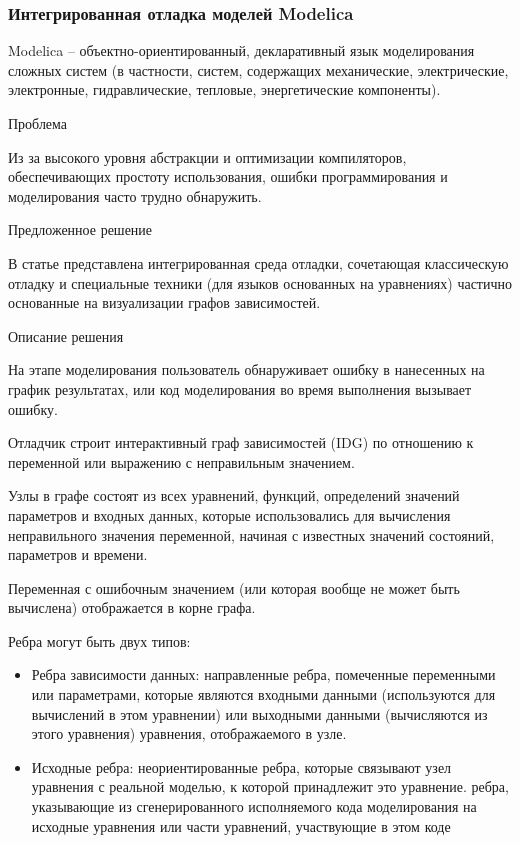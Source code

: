 \subsubsection{Интегрированная отладка моделей Modelica \cite{Pop2014}}

Modelica -- объектно-ориентированный, декларативный язык моделирования сложных систем (в частности, систем, содержащих механические, электрические, электронные, гидравлические, тепловые, энергетические компоненты). 
\newline

Проблема

Из за высокого уровня абстракции и оптимизации компиляторов, обеспечивающих простоту использования, ошибки программирования и моделирования часто трудно обнаружить.
\newline

Предложенное решение

В статье представлена интегрированная среда отладки, сочетающая классическую отладку и специальные техники (для языков основанных на уравнениях) частично основанные на визуализации графов зависимостей.
\newline

Описание решения

На этапе моделирования пользователь обнаруживает ошибку в нанесенных на график результатах, или код моделирования во время выполнения вызывает ошибку.

Отладчик строит интерактивный граф зависимостей (IDG) по отношению к переменной или выражению с неправильным значением.

Узлы в графе состоят из всех уравнений, функций, определений значений параметров и входных данных, которые использовались для вычисления неправильного значения переменной, начиная с известных значений состояний, параметров и времени.

Переменная с ошибочным значением (или которая вообще не может быть вычислена) отображается в корне графа.

Ребра могут быть двух типов:
\begin{itemize}
	\item Ребра зависимости данных: направленные ребра, помеченные переменными или параметрами, которые являются входными данными (используются для вычислений в этом уравнении) или выходными данными (вычисляются из этого уравнения) уравнения, отображаемого в узле.
	\item Исходные ребра: неориентированные ребра, которые связывают узел уравнения с реальной моделью, к которой принадлежит это уравнение.
	ребра, указывающие из сгенерированного исполняемого кода моделирования на исходные уравнения или части уравнений, участвующие в этом коде
\end{itemize}


